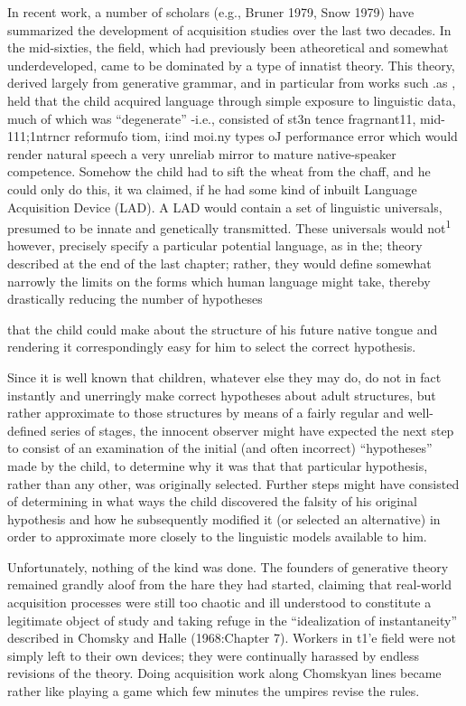 In recent work, a number of scholars (e.g., Bruner 1979, Snow 1979) have summarized the development of acquisition studies over the last two decades. In the mid-sixties, the field, which had previously been atheoretical and somewhat underdeveloped, came to be domi\-nated by a type of innatist theory. This theory, derived largely from generative grammar, and in particular from works such .as \citet{Chomsky1962}, held that the child acquired language through simple exposure to linguistic data, much of which was ``degenerate'' {}-i.e., consisted of st3n tence fragrnant11, mid-111;1ntrncr reformufo tiom, i:ind moi.ny types oJ performance error which would render natural speech a very unreliab mirror to mature native-speaker competence. Somehow the child had to sift the wheat from the chaff, and he could only do this, it wa claimed, if he had some kind of inbuilt Language Acquisition Device (LAD). A LAD would contain a set of linguistic universals, presumed to be innate and genetically transmitted. These universals would not\textsuperscript{1} however, precisely specify a particular potential language, as in the; theory described at the end of the last chapter; rather, they would de\-fine somewhat narrowly the limits on the forms which human language might take, thereby drastically reducing the number of hypotheses

that the child could make about the structure of his future native tongue and rendering it correspondingly easy for him to select the correct hypothesis.

Since it is well known that children, whatever else they may do, do not in fact instantly and unerringly make correct hypotheses about adult structures, but rather approximate to those structures by means of a fairly regular and well-defined series of stages, the innocent ob\-server might have expected the next step to consist of an examination of the initial (and often incorrect) ``hypotheses'' made by the child, to determine why it was that that particular hypothesis, rather than any other, was originally selected. Further steps might have con\-sisted of determining in what ways the child discovered the falsity of his original hypothesis and how he subsequently modified it (or selected an alternative) in order to approximate more closely to the linguistic models available to him.

Unfortunately, nothing of the kind was done. The founders of generative theory remained grandly aloof from the hare they had started, claiming that real-world acquisition processes were still too chaotic and ill understood to constitute a legitimate object of study and taking refuge in the ``idealization of instantaneity'' described in Chomsky and Halle (1968:Chapter 7). Workers in t1'e field were not simply left to their own devices; they were continually harassed by endless revisions of the theory. Doing acquisition work along Chom\-skyan lines became rather like playing a game which few minutes the umpires revise the rules.

